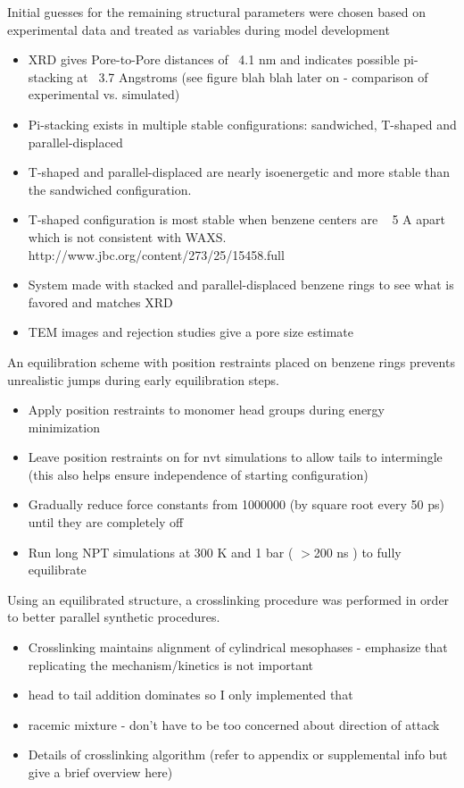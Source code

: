 \documentclass{article}
\begin{document}
\begin{itemize}
\begin{itemize}
	\noindent Initial guesses for the remaining structural parameters were chosen based on experimental data and treated as variables during model development 
	\begin{itemize}
		\item XRD gives Pore-to-Pore distances of ~4.1 nm and indicates possible pi-stacking at ~3.7 Angstroms (see figure blah blah later on - comparison of experimental vs. simulated)
		\item Pi-stacking exists in multiple stable configurations: sandwiched, T-shaped and parallel-displaced
		\item T-shaped and parallel-displaced are nearly isoenergetic and more stable than the sandwiched configuration.
		\item T-shaped configuration is most stable when benzene centers are ~ 5 A apart which is not consistent with WAXS. http://www.jbc.org/content/273/25/15458.full 
		\item System made with stacked and parallel-displaced benzene rings to see what is favored and matches XRD
		\item TEM images and rejection studies give a pore size estimate
	\end{itemize}

	An equilibration scheme with position restraints placed on benzene rings prevents unrealistic jumps during early equilibration steps.
		\begin{itemize}
			\item Apply position restraints to monomer head groups during energy minimization 
			\item Leave position restraints on for nvt simulations to allow tails to intermingle (this also helps ensure independence of starting configuration)
			\item Gradually reduce force constants from 1000000 (by square root every 50 ps) until they are completely off
			\item Run long NPT simulations at 300 K and 1 bar ( $>$200 ns ) to fully equilibrate 
		\end{itemize}
	\end{itemize}
	
	Using an equilibrated structure, a crosslinking procedure was performed in order to better parallel synthetic procedures. 
	\begin{itemize}
		\item Crosslinking maintains alignment of cylindrical mesophases - emphasize that replicating the mechanism/kinetics is not important 
		\item head to tail addition dominates so I only implemented that
		\item racemic mixture - don't have to be too concerned about direction of attack 
		\item Details of crosslinking algorithm (refer to appendix or supplemental info but give a brief overview here)
	\end{itemize}  
	

\end{itemize}
\end{document}
